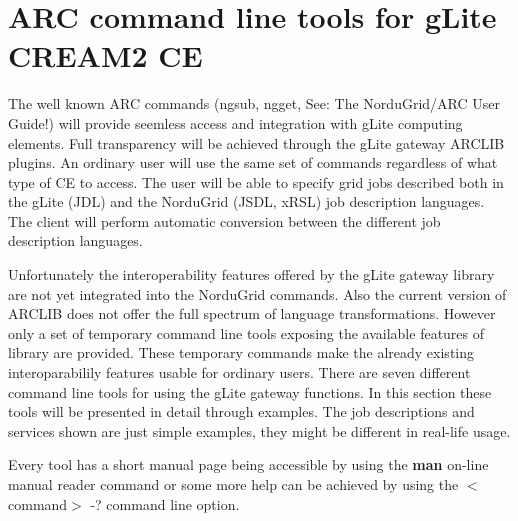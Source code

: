 \documentclass{article}
\begin{document}
\section{ARC command line tools for gLite CREAM2 CE}
\label{Users guide}
The well known ARC commands (ngsub, ngget, See: The NorduGrid/ARC User Guide\cite{userguide}!) will provide seemless access and integration with gLite computing elements. Full transparency will be achieved through the gLite gateway ARCLIB plugins. An ordinary user will use the same set of commands regardless of what type of CE to access. The user will be able to specify grid jobs described both in the gLite (JDL) and the NorduGrid (JSDL, xRSL) job description languages. The client will perform automatic conversion between the different job description languages.\par
Unfortunately the interoperability features offered by the gLite gateway library are not yet integrated into the NorduGrid commands. Also the current version of ARCLIB does not offer the full spectrum of language transformations.
However only a set of temporary command line tools exposing the available features of library are provided. These temporary commands make the already existing interoparabilily features usable for ordinary users.
There are seven different command line tools for using the gLite gateway functions. In this section these tools will be presented in detail through examples. The job descriptions and services shown are just simple examples, they might be different in real-life usage.\par
Every tool has a short manual page being accessible by using the \textbf{man} on-line manual reader command or some more help can be achieved by using the $<$command$>$ -? command line option.\par
\end{document}
